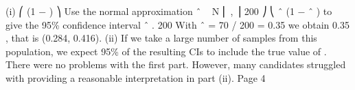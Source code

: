 \documentclass[a4paper,12pt]{article}
\begin{document}

(i)
⎛ \theta (1 − \theta ) ⎞
Use the normal approximation \theta ˆ ~ N ⎜ \theta ,
⎟
200 ⎠
⎝
\theta ˆ (1 − \theta ˆ )
to give the 95\% confidence interval \theta ˆ 
.
200
With \theta ˆ = 70 / 200 = 0.35 we obtain 0.35  , that is (0.284, 0.416).
(ii)
If we take a large number of samples from this population, we expect 95\% of
the resulting CIs to include the true value of \theta.
There were no problems with the first part. However, many candidates struggled with
providing a reasonable interpretation in part (ii).
Page 4%
\end{document}
